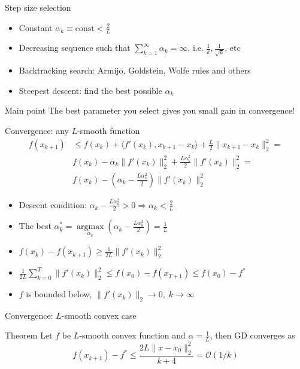 \documentclass{beamer}
\DeclareMathOperator*{\argmax}{\arg\max}
\begin{document}
\begin{frame}{Step size selection}

\begin{itemize}
\item Constant $\alpha_k \equiv \mathrm{const} < \frac{2}{L}$
\item Decreasing sequence such that $\sum\limits_{k=1}^{\infty} \alpha_k = \infty$, i.e. $\frac{1}{k}, \frac{1}{\sqrt{k}}$, etc
\item Backtracking search: Armijo, Goldstein, Wolfe rules and others
\item Steepest descent: find the best possible $\alpha_k$
\end{itemize}

\begin{block}{Main point}
The best parameter you select gives you small gain in convergence! 
\end{block}

\end{frame}

\begin{frame}{Convergence: any $L$-smooth function}
\begin{equation*}
\begin{split}
f(x_{k+1}) &\leq f(x_k) + \langle f'(x_k), x_{k+1} - x_k \rangle + \frac{L}{2}\|x_{k+1} - x_k\|_2^2 = \\
& f(x_k) - \alpha_k \|f'(x_k)\|_2^2 + \frac{L \alpha^2_k}{2} \|f'(x_k)\|_2^2 = \\
& f(x_k) - \left(\alpha_k - \frac{L\alpha_k^2}{2}\right)\|f'(x_k)\|_2^2
\end{split}
\end{equation*}
\begin{itemize}
\item Descent condition: $\alpha_k - \frac{L\alpha_k^2}{2} > 0 \Rightarrow \alpha_k < \frac{2}{L}$
\item  The best $\alpha^*_k = \argmax\limits_{\alpha_k}\left(\alpha_k - \frac{L\alpha_k^2}{2}\right) = \frac{1}{L}$
\item $f(x_k) - f(x_{k+1}) \geq \frac{1}{2L}\|f'(x_k)\|_2^2$
\item $\frac{1}{2L} \sum\limits_{k=0}^T \|f'(x_k)\|_2^2 \leq f(x_0) - f(x_{T+1}) \leq f(x_0) - f^*$
\item $f$ is bounded below, $\|f'(x_k)\|_2 \to 0, \; k \to \infty$
\end{itemize}
\end{frame}

\begin{frame}{Convergence: $L$-smooth convex case}
\begin{block}{Theorem}
Let $f$ be $L$-smooth convex function and $\alpha = \frac{1}{L}$, then GD converges as
\[
f(x_{k+1}) - f^* \leq \frac{2L\|x - x_0\|^2_2}{k+4} = \mathcal{O}(1 / k)
\]
\end{block}
\end{frame}
\end{document}
